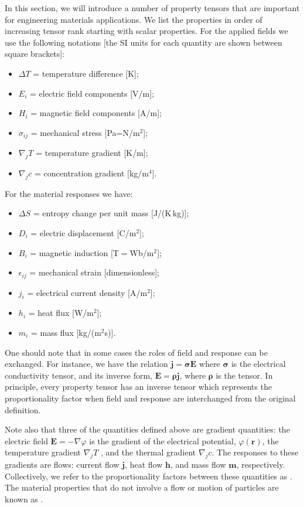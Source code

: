 In this section, we will introduce a number of property tensors that are important for engineering materials applications.  We list the properties in order of increasing tensor rank starting with scalar properties.  For the applied fields we use the following notations [the SI units for each quantity are shown between square brackets]: 
 \begin{itemize}
 \item $\Delta T$ = temperature difference [K]; 
 \item $E_i$ = electric field components [V/m]; 
 \item $H_i$ = magnetic field components [A/m]; 
 \item $\sigma_{ij}$ = mechanical stress [Pa=N/m$^2$]; 
 \item $\nabla_j T$ = temperature gradient [K/m];
 \item $\nabla_j c$ = concentration gradient [kg/m$^4$]. 
 \end{itemize}
 
\noindent For the material responses we have: 
 \begin{itemize}
 \item $\Delta S$ = entropy change per unit mass [J/(K\,kg)]; 
 \item $D_i$ = electric displacement [C/m$^2$]; 
 \item $B_i$ = magnetic induction [T$=$Wb/m$^2$]; 
 \item $\epsilon_{ij}$ = mechanical strain [dimensionless]; 
 \item $j_i$ = electrical current density [A/m$^2$]; 
 \item $h_i$ = heat flux [W/m$^2$]; 
 \item $m_i$ = mass flux [kg/(m$^2$s)].  
 \end{itemize}
One should note that in some cases the roles of field and response can be exchanged. For instance, we have the relation $\mathbf{j}=\bm{\sigma}\mathbf{E}$ where $\bm{\sigma}$ is the electrical conductivity tensor, and its inverse form, $\mathbf{E}=\bm{\rho}\mathbf{j}$, where $\bm{\rho}$ is the  tensor. In principle, every property tensor has an inverse tensor which represents the proportionality factor when field and response are interchanged from the original definition.

Note also that three of the quantities defined above are gradient quantities: the electric field $\mathbf{E}=-\nabla\varphi$ is the gradient of the electrical potential, $\varphi(\mathbf{r})$, the temperature gradient  $\nabla_j T$ , and the thermal gradient $\nabla_j c$.  The responses to these gradients are flows: current flow $\mathbf{j}$, heat flow $\mathbf{h}$, and mass flow $\mathbf{m}$, respectively.  Collectively, we refer to the proportionality factors between these quantities as . The material properties that do not involve a flow or motion of particles are known as .

